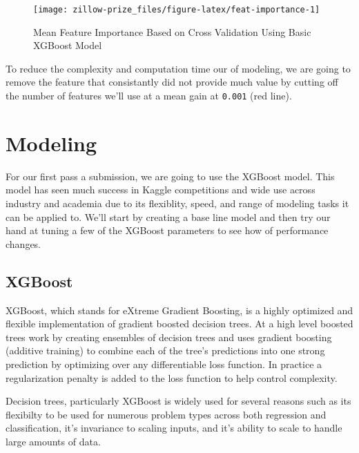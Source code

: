 \documentclass[]{book}
\newenvironment{Shaded}{\begin{snugshade}}{\end{snugshade}}
\newcommand{\KeywordTok}[1]{\textcolor[rgb]{0.13,0.29,0.53}{\textbf{#1}}}
\newcommand{\FloatTok}[1]{\textcolor[rgb]{0.00,0.00,0.81}{#1}}
\newcommand{\StringTok}[1]{\textcolor[rgb]{0.31,0.60,0.02}{#1}}
\newcommand{\OperatorTok}[1]{\textcolor[rgb]{0.81,0.36,0.00}{\textbf{#1}}}
\newcommand{\NormalTok}[1]{#1}
\theoremstyle{definition}
\theoremstyle{definition}
\theoremstyle{definition}
\theoremstyle{remark}
\begin{document}
\begin{figure}
\texttt{[image: zillow-prize\_files/figure-latex/feat-importance-1]} \caption{Mean Feature Importance Based on Cross Validation Using Basic XGBoost Model}\label{fig:feat-importance}
\end{figure}

To reduce the complexity and computation time our of modeling, we are
going to remove the feature that consistantly did not provide much value
by cutting off the number of features we'll use at a mean gain at
\texttt{0.001} (red line).

\begin{Shaded}
\end{Shaded}

\chapter{Modeling}\label{modeling}

For our first pass a submission, we are going to use the XGBoost model.
This model has seen much success in Kaggle competitions and wide use
across industry and academia due to its flexiblity, speed, and range of
modeling tasks it can be applied to. We'll start by creating a base line
model and then try our hand at tuning a few of the XGBoost parameters to
see how of performance changes.

\section{XGBoost}\label{xgboost}

XGBoost, which stands for eXtreme Gradient Boosting, is a highly
optimized and flexible implementation of gradient boosted decision
trees. At a high level boosted trees work by creating ensembles of
decision trees and uses gradient boosting (additive training) to combine
each of the tree's predictions into one strong prediction by optimizing
over any differentiable loss function. In practice a regularization
penalty is added to the loss function to help control complexity.

Decision trees, particularly XGBoost is widely used for several reasons
such as its flexibilty to be used for numerous problem types across both
regression and classification, it's invariance to scaling inputs, and
it's ability to scale to handle large amounts of data.
\end{document}
